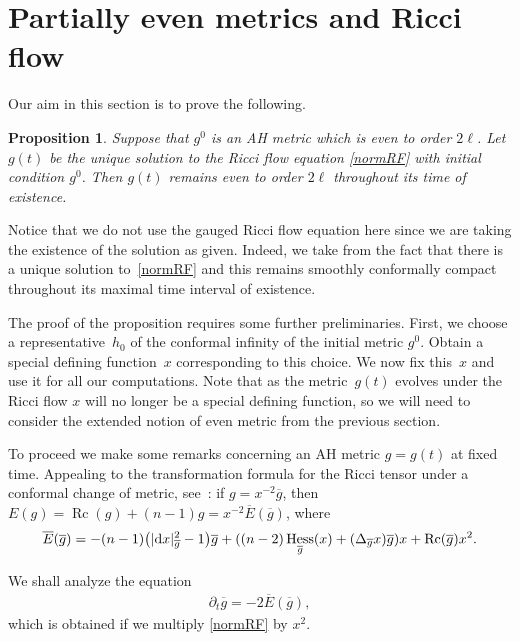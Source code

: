 \documentclass[pdftex]{sigma}
\numberwithin{equation}{section}
\newtheorem{Proposition}[Theorem]{Proposition}
 { \theoremstyle{definition}
\newtheorem{Definition}[Theorem]{Definition}
\newtheorem{Example}[Theorem]{Example}
\newtheorem{Remark}[Theorem]{Remark} }
\newcommand{\del}{\partial}
\newcommand{\olg}{\overline{g}}
\newcommand{\olE}{\overline{E}}
\newcommand{\gin}{{g^0}}
\newcommand{\gbar}{\overline{g}}
\DeclareMathOperator{\Rc}{Rc}
\DeclareMathOperator{\hess}{Hess}
\begin{document}
\section{Partially even metrics and Ricci flow} \label{PEandRF}

Our aim in this section is to prove the following.

\begin{Proposition} \label{prop:even-expansions-preserved}	Suppose that $\gin$ is an AH metric which is even to order $2\ell$. Let $g(t)$ be the unique solution to the Ricci flow	equation \eqref{normRF} with initial condition $\gin$. Then $g(t)$ remains even to order $2\ell$ throughout its time of existence.
\end{Proposition}

Notice that we do not use the gauged Ricci flow equation here since we are taking the existence of the solution as given. Indeed, we take from \cite{Bahuaud} the fact that there is a unique solution to~\eqref{normRF} and this remains smoothly conformally compact throughout its maximal time interval of existence.

The proof of the proposition requires some further preliminaries. First, we choose a representative~$h_0$ of the conformal infinity of the initial metric $\gin$. Obtain a special defining function~$x$ corresponding to this choice. We now fix this~$x$ and use it for all our computations. Note that as the metric~$g(t)$ evolves under the Ricci flow $x$ will no longer be a special defining function, so we will need to consider the extended notion of even metric from the previous section.

To proceed we make some remarks concerning an AH metric $g = g(t)$ at fixed time. Appealing to the transformation formula for the Ricci tensor under a conformal change of metric, see~\cite{Besse}:
if $g = x^{-2} \olg$, then $E(g) = \Rc(g) + (n-1)g = x^{-2} \olE(\olg)$, where
\begin{gather}\label{eq2.1}
\olE(\olg) = - (n-1) \big(|{\rm d}x|^2_{\gbar} -1\big) \olg + ( (n-2) \hess_{\olg} (x) + (\Delta_{\olg} x) \olg ) x + \Rc(\gbar) x^2 .
\end{gather}

We shall analyze the equation
\begin{gather}
\del_t \olg = -2 \olE( \olg),\label{rf1}
\end{gather}
which is obtained if we multiply \eqref{normRF} by $x^2$.
\end{document}
